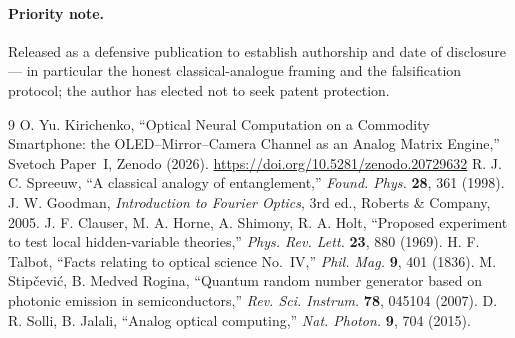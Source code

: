 \documentclass[11pt]{article}
\begin{document}
\paragraph{Priority note.} Released as a defensive publication to establish authorship and date
of disclosure --- in particular the honest classical-analogue framing and the falsification
protocol; the author has elected not to seek patent protection.

\begin{thebibliography}{9}\small
{} O. Yu. Kirichenko, ``Optical Neural Computation on a Commodity Smartphone: the OLED--Mirror--Camera Channel as an Analog Matrix Engine,'' Svetoch Paper~I, Zenodo (2026). \url{https://doi.org/10.5281/zenodo.20729632}
 R. J. C. Spreeuw, ``A classical analogy of entanglement,'' \emph{Found. Phys.} \textbf{28}, 361 (1998).
 J. W. Goodman, \emph{Introduction to Fourier Optics}, 3rd ed., Roberts \& Company, 2005.
 J. F. Clauser, M. A. Horne, A. Shimony, R. A. Holt, ``Proposed experiment to test local hidden-variable theories,'' \emph{Phys. Rev. Lett.} \textbf{23}, 880 (1969).
 H. F. Talbot, ``Facts relating to optical science No.\ IV,'' \emph{Phil. Mag.} \textbf{9}, 401 (1836).
 M. Stip\v{c}evi\'c, B. Medved Rogina, ``Quantum random number generator based on photonic emission in semiconductors,'' \emph{Rev. Sci. Instrum.} \textbf{78}, 045104 (2007).
 D. R. Solli, B. Jalali, ``Analog optical computing,'' \emph{Nat. Photon.} \textbf{9}, 704 (2015).
\end{thebibliography}

\svetochfooter
\end{document}
